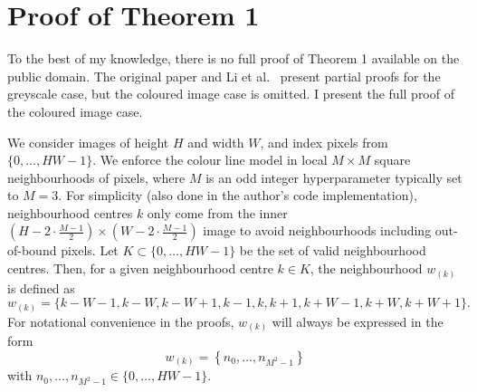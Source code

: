 \documentclass{article}
\begin{document}
\section{Proof of Theorem 1}
To the best of my knowledge, there is no full proof of Theorem 1 available on the public domain. The original paper \cite{closed-form-matting} and Li et al.\ \cite{closed-form-survey} present partial proofs for the greyscale case, but the coloured image case is omitted. I present the full proof of the coloured image case.

We consider images of height $H$ and width $W$, and index pixels from $\{0,\dots,HW-1\}$. We enforce the colour line model \cite[Theorem 2]{closed-form-matting} in local $M\times M$ square neighbourhoods of pixels, where $M$ is an odd integer hyperparameter typically set to $M=3$. For simplicity (also done in the author's code implementation), neighbourhood centres $k$ only come from the inner $\left(H-2\cdot \frac{M-1}{2}\right)\times \left(W-2\cdot \frac{M-1}{2}\right)$ image to avoid neighbourhoods including out-of-bound pixels. Let $K\subset \{0,\dots,HW-1\}$ be the set of valid neighbourhood centres. Then, for a given neighbourhood centre $k\in K$, the neighbourhood $w_{(k)}$ is defined as
$$ w_{(k)} = \{k-W-1, k-W, k-W+1, k-1, k, k+1, k+W-1, k+W, k+W+1\}.$$
For notational convenience in the proofs, $w_{(k)}$ will always be expressed in the form
$$w_{(k)} = \left\{n_0, \dots, n_{M^2-1} \right\}$$
with $n_0,\dots,n_{M^2-1}\in\{0,\dots,HW-1\}$.
\end{document}
